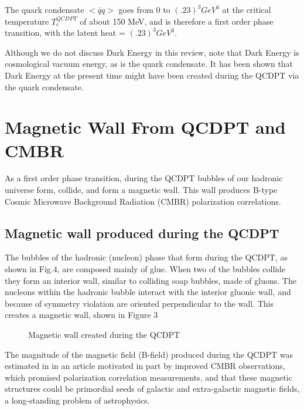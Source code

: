 The quark condensate $<\bar{q}q>$ goes from 0 to $(.23)^3 GeV^3$ at the 
critical temperature $T^{QCDPT}_c$ of about 150 MeV, and is therefore a 
first order phase transition, with the latent heat = $(.23)^3 GeV^3$.
 
 Although we do not discuss Dark Energy in this review, note that
Dark Energy is cosmological vacuum energy, as is the quark condensate. It
has been shown that Dark Energy at the present time might have been created
during the QCDPT via the quark condensate\cite{zmk12}.

\section{Magnetic Wall From QCDPT and CMBR}

As a first order phase transition, during the QCDPT bubbles of our hadronic
universe form, collide, and form a magnetic wall. This wall produces B-type
Cosmic Microwave Background Radiation (CMBR) polarization correlations. 

\subsection{Magnetic wall produced during the QCDPT}

  The bubbles of the hadronic (nucleon) phase that form during the QCDPT, 
as shown in Fig.4, are composed mainly of glue. When two of the bubbles
collide they form an interior wall, similar to colliding soap bubbles, 
made of gluons. The nucleons within the hadronic bubble interact with the 
interior gluonic wall, and because of symmetry violation are oriented 
perpendicular to the wall. This creates a magnetic wall, shown in Figure 3
\newpage

\vspace{8.0cm}

\begin{figure}[ht]
\begin{center}
\end{center}
\caption{Magnetic wall created during the QCDPT}
\end{figure} 

  The magnitude of the magnetic field (B-field) produced during the QCDPT
was estimated in \cite{lsk03} in an article motivated in part by improved 
CMBR observations, which promised polarization correlation measurements, and
that these magnetic structures could be primordial seeds of galactic and 
extra-galactic magnetic fields, a long-standing problem of astrophysics.

